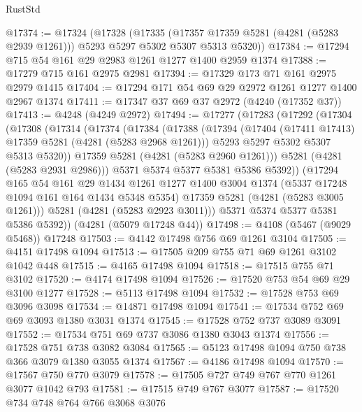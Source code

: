 \begin{lexlean}{RustStd}
\begin{coremodule}
{\begin{coremodule}
{{{{{{{{{{{{{{{{{{{{{{{{{{{{{{{{{{{@17374 := @17324
    (@17328
      (@17335
        (@17357 @17359 @5281 (@4281 (@5283 @2939 @1261)))
        @5293
        @5297
        @5302
        @5307
        @5313
        @5320))
@17384 := @17294 @715 @54 @161 @29 @2983 @1261 @1277 @1400 @2959 @1374
@17388 := @17279 @715 @161 @2975 @2981
@17394 := @17329 @173 @71 @161 @2975 @2979 @1415
@17404 := @17294 @171 @54 @69 @29 @2972 @1261 @1277 @1400 @2967 @1374
@17411 := @17347 @37 @69 @37 @2972 (@4240 (@17352 @37))
@17413 := @4248 (@4249 @2972)
@17494 := @17277
    (@17283
      (@17292
        (@17304
          (@17308
            (@17314
              (@17374
                (@17384
                  (@17388
                    (@17394
                      (@17404 (@17411 @17413) @17359 @5281 (@4281 (@5283 @2968 @1261)))
                      @5293
                      @5297
                      @5302
                      @5307
                      @5313
                      @5320))
                  @17359
                  @5281
                  (@4281 (@5283 @2960 @1261)))
                @5281
                (@4281 (@5283 @2931 @2986)))
              @5371
              @5374
              @5377
              @5381
              @5386
              @5392))
          (@17294
            @165
            @54
            @161
            @29
            @1434
            @1261
            @1277
            @1400
            @3004
            @1374
            (@5337 @17248 @1094 @161 @164 @1434 @5348 @5354)
            @17359
            @5281
            (@4281 (@5283 @3005 @1261)))
          @5281
          (@4281 (@5283 @2923 @3011)))
        @5371
        @5374
        @5377
        @5381
        @5386
        @5392))
    (@4281 (@5079 @17248 @44))
@17498 := @4108 (@5467 (@9029 @5468)) @17248
@17503 := @4142 @17498 @756 @69 @1261 @3104
@17505 := @4151 @17498 @1094
@17513 := @17505 @209 @755 @71 @69 @1261 @3102 @1042 @448
@17515 := @4165 @17498 @1094
@17518 := @17515 @755 @71 @3102
@17520 := @4174 @17498 @1094
@17526 := @17520 @753 @54 @69 @29 @3100 @1277
@17528 := @5113 @17498 @1094
@17532 := @17528 @753 @69 @3096 @3098
@17534 := @14871 @17498 @1094
@17541 := @17534 @752 @69 @69 @3093 @1380 @3031 @1374
@17545 := @17528 @752 @737 @3089 @3091
@17552 := @17534 @751 @69 @737 @3086 @1380 @3043 @1374
@17556 := @17528 @751 @738 @3082 @3084
@17565 := @5123 @17498 @1094 @750 @738 @366 @3079 @1380 @3055 @1374
@17567 := @4186 @17498 @1094
@17570 := @17567 @750 @770 @3079
@17578 := @17505 @727 @749 @767 @770 @1261 @3077 @1042 @793
@17581 := @17515 @749 @767 @3077
@17587 := @17520 @734 @748 @764 @766 @3068 @3076
}}}}}}}}}}}}}}}}}}}}}}}}}}}}}}}}}}}
\end{coremodule}}
\end{coremodule}
\end{lexlean}
